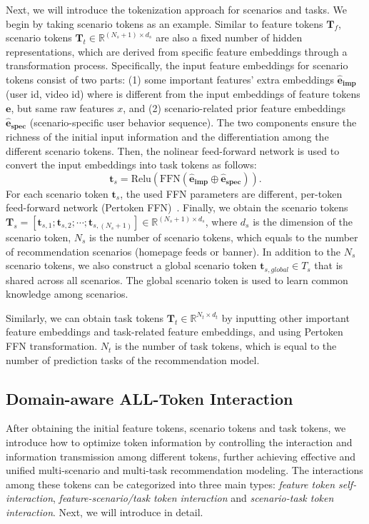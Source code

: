 Next, we will introduce the tokenization approach for scenarios and tasks.
We begin by taking scenario tokens as an example.
Similar to feature tokens $\bm{T}_{f}$, scenario tokens $\bm{T}_{t} \in \mathbb{R}^{(N_{s} + 1) \times d_{s}}$ are also a fixed number of hidden representations, which are derived from specific feature embeddings through a transformation process.
Specifically, the input feature embeddings for scenario tokens consist of two parts: (1) some important features' extra embeddings $\bm{\hat{e}_{imp}}$ (\eg user id, video id) where is different from the input embeddings of feature tokens $\bm{e}$, but same raw features $x$, and (2) scenario-related prior feature embeddings $\bm{\hat{e}_{spec}}$ (\eg scenario-specific user behavior sequence).
The two components ensure the richness of the initial input information and the differentiation among the different scenario tokens.
Then, the nolinear feed-forward network is used to convert the input embeddings into task tokens as follows:
\begin{equation}
    \bm{t}_{s} = \text{Relu}(\text{FFN}(\bm{\hat{e}_{imp}} \oplus \bm{\hat{e}_{spec}})).
\end{equation}
For each scenario token $\bm{t}_{s}$, the used FFN parameters are different, \ie per-token feed-forward network (Pertoken FFN)~\cite{RankMixer}.
Finally, we obtain the scenario tokens $\bm{T}_{s} = [\bm{t}_{s,1};\bm{t}_{s,2};\cdots;\bm{t}_{s,(N_{s} + 1)}] \in \mathbb{R}^{(N_{s} + 1) \times d_{s}}$, where $d_{s}$ is the dimension of the scenario token, $N_{s}$ is the number of scenario tokens, which equals to the number of recommendation scenarios (\eg homepage feeds or banner).
In addition to the $N_{s}$ scenario tokens, we also construct a global scenario token $\bm{t}_{s,global} \in T_{s}$ that is shared across all scenarios.
The global scenario token is used to learn common knowledge among scenarios.

Similarly, we can obtain task tokens $\bm{T}_{t} \in \mathbb{R}^{N_{t} \times d_{t}}$ by inputting other important feature embeddings and task-related feature embeddings, and using Pertoken FFN transformation.
$N_{t}$ is the number of task tokens, which is equal to the number of prediction tasks of the recommendation model.

\subsection{Domain-aware ALL-Token Interaction}
After obtaining the initial feature tokens, scenario tokens and task tokens, we introduce how to optimize token information by controlling the interaction and information transmission among different tokens, further achieving effective and unified multi-scenario and multi-task recommendation modeling.
The interactions among these tokens can be categorized into three main types: \emph{feature token self-interaction}, \emph{feature-scenario/task token interaction} and \emph{scenario-task token interaction}.
Next, we will introduce in detail.

